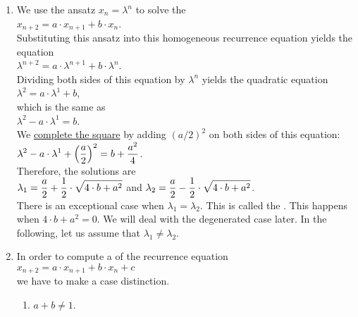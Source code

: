 \begin{enumerate}
\item We use the ansatz $x_n = \lambda^n$ to solve the 
      \\[0.2cm]
      \hspace*{1.3cm}
      $x_{n+2} = a \cdot x_{n+1} + b \cdot x_n$.
      \\[0.2cm]
      Substituting this ansatz into this homogeneous recurrence equation yields the equation
      \\[0.2cm]
      \hspace*{1.3cm}
      $\lambda^{n+2} = a \cdot \lambda^{n+1} + b \cdot \lambda^n$.
      \\[0.2cm]
      Dividing both sides of this equation by $\lambda^n$ yields the quadratic equation
      \\[0.2cm]
      \hspace*{1.3cm}
      $\lambda^{2} = a \cdot \lambda^{1} + b$,
      \\[0.2cm]
      which is the same as
      \\[0.2cm]
      \hspace*{1.3cm}
      $\lambda^{2} - a \cdot \lambda^{1} = b$.
      \\[0.2cm]
      We \href{https://en.wikipedia.org/wiki/Completing_the_square}{complete the square} by adding $(a/2)^2$ on
      both sides of this equation: 
      \\[0.2cm]
      \hspace*{1.3cm}
      $\displaystyle \lambda^{2} - a \cdot \lambda^{1} + \Bigl(\frac{a}{2}\Bigr)^2 = b + \frac{a^2}{4}$.
      \\[0.2cm]
      Therefore, the solutions are
      \\[0.2cm]
      \hspace*{1.3cm}
      $\displaystyle\lambda_1 = \frac{a}{2} + \frac{1}{2} \cdot \sqrt{4 \cdot b + a^2}$ \quad and \quad
      $\displaystyle\lambda_2 = \frac{a}{2} - \frac{1}{2} \cdot \sqrt{4 \cdot b + a^2}$.
      \\[0.2cm]
      There is an exceptional case when $\lambda_1 = \lambda_2$.  This is called the 
      .
      This happens when $4 \cdot b + a^2 = 0$.  We will deal with the degenerated case later.  In the
      following, let us assume that $\lambda_1 \not= \lambda_2$.
\item In order to compute a   of the  recurrence equation
      \\[0.2cm]
      \hspace*{1.3cm}
      $x_{n+2} = a \cdot x_{n+1} + b \cdot x_n + c$
      \\[0.2cm]
      we have to make a case distinction.
      \begin{enumerate}
      \item $a + b \not= 1$.


\end{enumerate}
\end{enumerate}
